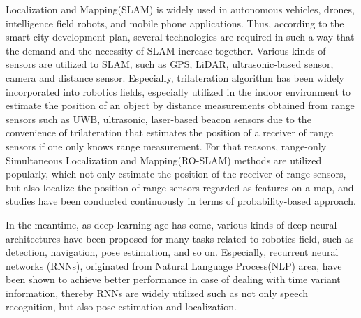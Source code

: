 \documentclass{ieeeaccess}
\begin{document}
 Localization and Mapping(SLAM) is widely used in autonomous vehicles, drones, intelligence field robots, and mobile phone applications. Thus, according to the smart city development plan, several technologies are required in such a way that the demand and the necessity of SLAM increase together. Various kinds of sensors are utilized to SLAM, such as GPS, LiDAR, ultrasonic-based sensor, camera and distance sensor. Especially, trilateration algorithm has been widely incorporated into robotics fields, especially utilized in the indoor environment to estimate the position of an object by distance measurements obtained from range sensors such as UWB, ultrasonic, laser-based beacon sensors \cite{thomas2005revisiting, cho2010mobile,raghavan2010accurate} due to the convenience of trilateration that estimates the position of a receiver of range sensors if one only knows range measurement. For that reasons, range-only Simultaneous Localization and Mapping(RO-SLAM) methods are utilized popularly, which not only estimate the position of the receiver of range sensors, but also localize the position of range sensors regarded as features on a map, and studies have been conducted continuously in terms of probability-based approach\cite{blanco2008pure,blanco2008efficient,fabresse2013undelayed, shetty2018particle}.


In the meantime, as deep learning age has come\cite{lecun2015deep}, various kinds of deep neural architectures have been proposed for many tasks related to robotics field, such as detection\cite{lenz2015deep,cai2016unified, smith2018object}, navigation\cite{zhu2017target, hamandi2018deepmotion}, pose estimation\cite{walch2017image}, and so on. Especially, recurrent neural networks (RNNs), originated from Natural Language Process(NLP) area\cite{elman1990finding}, have been shown to achieve better performance in case of dealing with time variant information, thereby RNNs are widely utilized such as not only speech recognition, but also pose estimation and localization\cite{walch2017image, gladh2016deep, wang2017deepvo, kendall2015posenet, turan2018deep}. 
\end{document}
